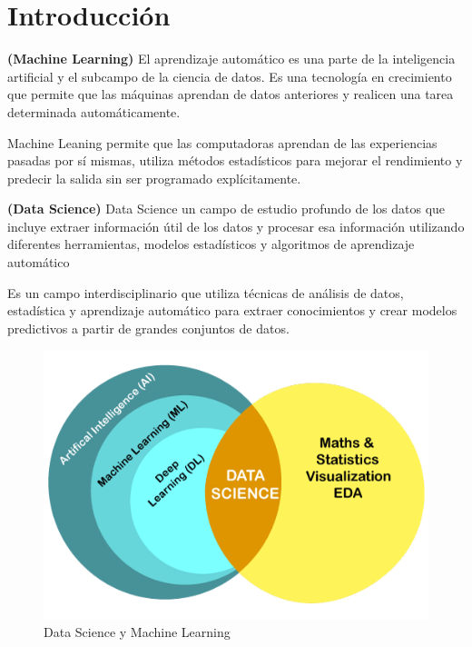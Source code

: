 \documentclass[../main.tex]{subfiles}
\begin{document}
\section{Introducción}

    \begin{definition} \textbf{(Machine Learning)}
        El aprendizaje automático es una parte de la inteligencia artificial y el subcampo de la ciencia de datos. Es una tecnología en crecimiento que permite que las máquinas aprendan de datos anteriores y realicen una tarea determinada automáticamente.
        
        Machine Leaning permite que las computadoras aprendan de las experiencias pasadas por sí mismas, utiliza métodos estadísticos para mejorar el rendimiento y predecir la salida sin ser programado explícitamente. \cite{diferencia_machine_learning_data_science}
    \end{definition}

    \begin{definition} \textbf{(Data Science)}
        Data Science un campo de estudio profundo de los datos que incluye extraer información útil de los datos y procesar esa información utilizando diferentes herramientas, modelos estadísticos y algoritmos de aprendizaje automático

        Es un campo interdisciplinario que utiliza técnicas de análisis de datos, estadística y aprendizaje automático para extraer conocimientos y crear modelos predictivos a partir de grandes conjuntos de datos.
    \end{definition}

    \begin{figure}[htb]
        \centering
        \includegraphics[scale=0.4]{../images/data-science-vs-machine-learning.png}
        \caption{Data Science y Machine Learning}
        \label{fig:data_science_vs_machine_learning}
    \end{figure}
\end{document}
